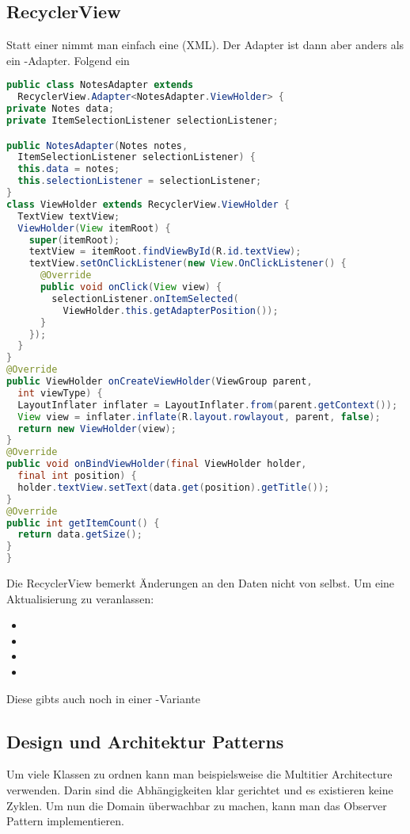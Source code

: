 \subsection{RecyclerView}
Statt einer  nimmt man einfach eine  (XML). Der Adapter ist dann aber anders als ein -Adapter. Folgend ein 
\begin{lstlisting}[language=java]
public class NotesAdapter extends 
  RecyclerView.Adapter<NotesAdapter.ViewHolder> {
private Notes data;
private ItemSelectionListener selectionListener;

public NotesAdapter(Notes notes, 
  ItemSelectionListener selectionListener) {
  this.data = notes;
  this.selectionListener = selectionListener;
}
class ViewHolder extends RecyclerView.ViewHolder {
  TextView textView;
  ViewHolder(View itemRoot) {
    super(itemRoot);
    textView = itemRoot.findViewById(R.id.textView);
    textView.setOnClickListener(new View.OnClickListener() {
      @Override
      public void onClick(View view) {
        selectionListener.onItemSelected(
          ViewHolder.this.getAdapterPosition());
      }
    });
  }
}
@Override
public ViewHolder onCreateViewHolder(ViewGroup parent, 
  int viewType) {
  LayoutInflater inflater = LayoutInflater.from(parent.getContext());
  View view = inflater.inflate(R.layout.rowlayout, parent, false);
  return new ViewHolder(view);
}
@Override
public void onBindViewHolder(final ViewHolder holder, 
  final int position) {
  holder.textView.setText(data.get(position).getTitle());
}
@Override
public int getItemCount() {
  return data.getSize();
}
}
\end{lstlisting}

Die RecyclerView bemerkt Änderungen an den Daten nicht von selbst. Um eine Aktualisierung zu veranlassen:
\begin{itemize}
  \item {}
  \item {}
  \item {}
  \item {}
\end{itemize}

Diese gibts auch noch in einer -Variante
\subsection{Design und Architektur Patterns}
Um viele Klassen zu ordnen kann man beispielsweise die Multitier Architecture verwenden. Darin sind die Abhängigkeiten klar gerichtet und es existieren keine Zyklen. Um nun die Domain überwachbar zu machen, kann man das Observer Pattern implementieren.

